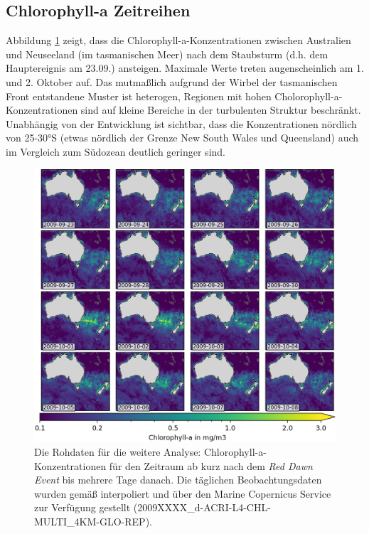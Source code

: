 \documentclass[12pt,a4paper,onecolumn]{scrartcl}
\begin{document}
\subsection{Chlorophyll-a Zeitreihen} \label{sec:chla_zeitreihen}
Abbildung \ref{fig:chla_collage} zeigt, dass die Chlorophyll-a-Konzentrationen zwischen Australien und Neuseeland (im tasmanischen Meer) nach dem Staubsturm (d.h. dem Hauptereignis am 23.09.) ansteigen. Maximale Werte treten augenscheinlich am 1. und 2. Oktober auf. Das mutmaßlich aufgrund der Wirbel der tasmanischen Front \citep{Gabric.2016} entstandene Muster ist heterogen, Regionen mit hohen Cholorophyll-a-Konzentrationen sind auf kleine Bereiche in der turbulenten Struktur beschränkt. Unabhängig von der Entwicklung ist sichtbar, dass die Konzentrationen nördlich von 25-30°S (etwas nördlich der Grenze New South Wales und Queensland) auch im Vergleich zum Südozean deutlich geringer sind.
\begin{figure}
\includegraphics[width=\textwidth]{bilder/chl_collage.png}
\caption{Die Rohdaten für die weitere Analyse: Chlorophyll-a-Konzentrationen für den Zeitraum ab kurz nach dem \textit{Red Dawn Event} bis mehrere Tage danach. Die täglichen Beobachtungsdaten wurden gemäß \cite{Saulquin.2019} interpoliert und über den Marine Copernicus Service zur Verfügung gestellt (2009XXXX_d-ACRI-L4-CHL-MULTI_4KM-GLO-REP).} \label{fig:chla_collage}
\end{figure}
\end{document}
